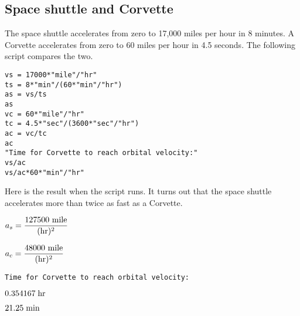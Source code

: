 
\subsection{Space shuttle and Corvette}
The space shuttle accelerates from zero to 17{,}000 miles per hour
in 8 minutes.
A Corvette accelerates from zero to 60 miles per hour in 4.5 seconds.
The following script compares the two.

\begin{Verbatim}[formatcom=\color{blue},samepage=true]
vs = 17000*"mile"/"hr"
ts = 8*"min"/(60*"min"/"hr")
as = vs/ts
as
vc = 60*"mile"/"hr"
tc = 4.5*"sec"/(3600*"sec"/"hr")
ac = vc/tc
ac
"Time for Corvette to reach orbital velocity:"
vs/ac
vs/ac*60*"min"/"hr"
\end{Verbatim}

Here is the result when the script runs.
It turns out that the space shuttle accelerates more than twice as fast as a
Corvette.

$\displaystyle a_s={\hbox{127500 mile}\over(\hbox{hr})^2}$

$\displaystyle a_c={\hbox{48000 mile}\over(\hbox{hr})^2}$

\verb$Time for Corvette to reach orbital velocity:$

$\displaystyle 0.354167\;\rm hr$

$\displaystyle 21.25\;\rm min$
